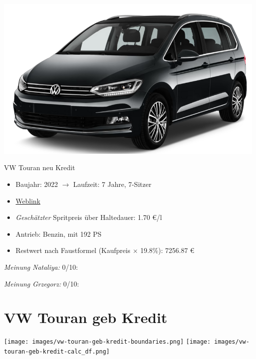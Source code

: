 \documentclass[landscape, DIV=99, 14pt]{scrartcl}
\begin{document}
\pagebreak
\begin{center}
\includegraphics[width=0.9\columnwidth]{cars/vw-touran.png}

VW Touran neu Kredit
\end{center}

\begin{itemize}
    \item Baujahr: 2022 $\rightarrow$ Laufzeit: 7 Jahre, 7-Sitzer
    \item \href{https://konfigurator.meinauto.de/volkswagen/neuwagen/8-touran/angebote/touran-active/konfigurator/\#!/preisvergleich/active/8864470/16,32,40,44,47,55,56,70,78,80/private/111369-2923-297336/4629/61ef049598ad9/cash-purchase/107670-6554-286080/48,0,10000,0,0,0,0,0,}{Weblink}
    \item \emph{Gesch\"atzter} Spritpreis \"uber Haltedauer: 1.70 \euro{}/l
    \item Antrieb: Benzin, mit 192 PS
    \item Restwert nach Faustformel (Kaufpreis $\times$ 19.8\%): 7256.87 \euro{}
\end{itemize}

\begin{small}
\emph{Meinung Nataliya:} 0/10: 
        
\emph{Meinung Grzegorz:} 0/10: 
\end{small}

\pagebreak


\twocolumn

\section*{VW Touran geb Kredit}
\begin{center}
\texttt{[image: images/vw-touran-geb-kredit-boundaries.png]}
\null
\vspace{0.5cm}
\texttt{[image: images/vw-touran-geb-kredit-calc\_df.png]}
\end{center}
\end{document}
